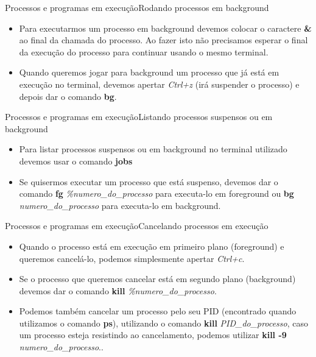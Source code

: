 \documentclass{beamer}
\begin{document}
\begin{frame}{Processos e programas em execu\c{c}ão}{Rodando processos em background}
  \begin{itemize}
  \item {Para executarmos um processo em background devemos colocar o caractere \textbf{\&} ao final da chamada do processo. Ao fazer isto não precisamos esperar o final da execu\c{c}ão do processo para continuar usando o mesmo terminal.}
  \item {Quando queremos jogar para background um processo que já está em execu\c{c}ão no terminal, devemos apertar \textit{Ctrl+z} (irá suspender o processo) e depois dar o comando \textbf{bg}.}
  \end{itemize}
\end{frame}

\begin{frame}{Processos e programas em execu\c{c}ão}{Listando processos suspensos ou em background}
  \begin{itemize}
  \item {Para listar processos suspensos ou em background no terminal utilizado devemos usar o comando \textbf{jobs}}
  \item {Se quisermos executar um processo que está suspenso, devemos dar o comando \textbf{fg}\textit{ \%numero\_do\_processo} para executa-lo em foreground ou \textbf{bg}\textit{ numero\_do\_processo} para executa-lo em background.}
  \end{itemize}
\end{frame}

\begin{frame}{Processos e programas em execu\c{c}ão}{Cancelando processos em execu\c{c}ão}
  \begin{itemize}
  \item {Quando o processo está em execu\c{c}ão em primeiro plano (foreground) e queremos cancelá-lo, podemos simplesmente apertar \textit{Ctrl+c}.}
  \item {Se o processo que queremos cancelar está em segundo plano (background) devemos dar o comando \textbf{kill} \textit{ \%numero\_do\_processo}.}
  
  \item{Podemos também cancelar um processo pelo seu PID (encontrado quando utilizamos o comando \textbf{ps}), utilizando o comando \textbf{kill} \textit{ PID\_do\_processo}, caso um processo esteja resistindo ao cancelamento, podemos utilizar \textbf{kill -9} \textit{ numero\_do\_processo}.. }
  \end{itemize}
\end{frame}
\end{document}
